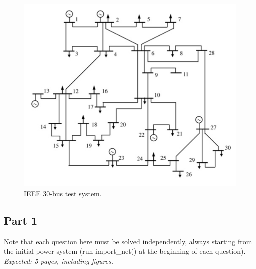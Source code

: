 \documentclass[11pt,a4paper]{article}
\begin{document}
\begin{figure}[ht!]
    \centering
    \includegraphics[scale=1]{ieee_30.png}
    \caption{IEEE 30-bus test system.}
    \label{fig:my_label}
\end{figure}

\subsection{Part 1}
Note that each question here must be solved independently, always starting from the initial power system (run import\_net() at the beginning of each question).\\
\textit{Expected: 5 pages, including figures.}
\end{document}

